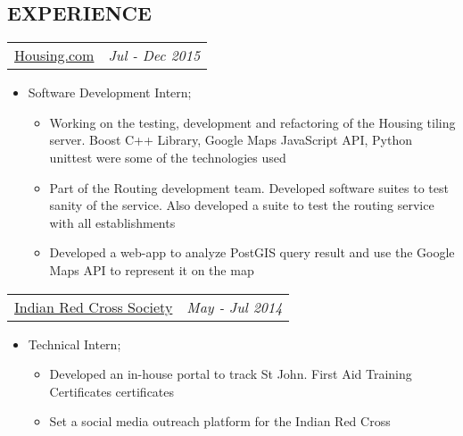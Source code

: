 \documentclass[margin]{res}
\begin{document}
\begin{resume}
\section{EXPERIENCE}      
					\begin{tabular}{p{4.2in} r} 
					\href{https://housing.com/in}{Housing.com} &  \textit{Jul - Dec 2015} 
					 \end{tabular}	
                   \begin{itemize} %
                    \item[] Software Development Intern; 
                        \begin{itemize}
                        \item Working on the testing, development and refactoring of the Housing tiling server. Boost C++ Library, Google Maps JavaScript API, Python unittest were some of the technologies used
                        \item Part of the Routing development team. Developed software suites to test sanity of the service. Also developed a suite to test the routing service with all establishments
                        \item Developed a web-app to analyze PostGIS query result and use the Google Maps API to represent it on the map
                        \end{itemize}
					 \end{itemize} 
                  \begin{tabular}{p{4.2in} r}  %
                  \href{http://www.indianredcross.org/}{Indian Red Cross Society} &  \textit{May - Jul 2014} 
                  \end{tabular}	
                   \begin{itemize} %
                   \item[] Technical Intern;
                   \begin{itemize}
                    \item Developed an in-house portal to track St John. First Aid Training Certificates certificates
                    \item Set a social media outreach platform for the Indian Red Cross
                    \end{itemize} 
		   \end{itemize} 

\end{resume}
\end{document}
